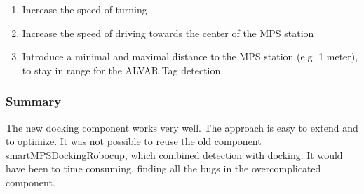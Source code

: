 \begin{enumerate}
\item Increase the speed of turning
\item Increase the speed of driving towards the center of the MPS station
\item Introduce a minimal and maximal distance to the MPS station (e.g. 1 meter), to stay in range for the ALVAR Tag detection
\end{enumerate}


\subsubsection{Summary}
The new docking component works very well. The approach is easy to extend and to optimize. It was not possible to reuse the old component smartMPSDockingRobocup, which combined detection with docking. It would have been to time consuming, finding all the bugs in the overcomplicated component. 
